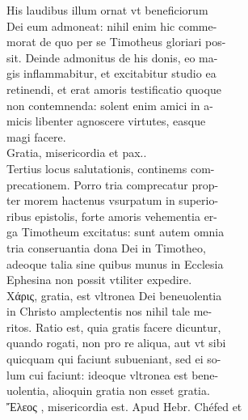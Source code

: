\documentclass{article}
\begin{document}
\begin{pages}
                His laudibus illum ornat vt beneficiorum \\
                Dei eum admoneat: nihil enim hic comme- \\
                morat de quo per se Timotheus gloriari pos- \\
                sit. Deinde admonitus de his donis, eo ma- \\
                gis inflammabitur, et excitabitur studio ea \\
                retinendi, et erat amoris testificatio quoque \\
                non contemnenda: solent enim amici in a- \\
                micis libenter agnoscere virtutes, easque \\
                magi facere. \\
                Gratia, misericordia et pax.. \\
                Tertius locus salutationis, continems com- \\
                precationem. Porro tria comprecatur prop- \\
                ter morem hactenus vsurpatum in superio- \\
                ribus epistolis, forte amoris vehementia er- \\
                ga Timotheum excitatus: sunt autem omnia \\
                tria conseruantia dona Dei in Timotheo, \\
                adeoque talia sine quibus munus in Ecclesia \\
                Ephesina non possit vtiliter expedire. \\
                Xάρις, gratia, est vltronea Dei beneuolentia \\
                in Christo amplectentis nos nihil tale me- \\
                ritos. Ratio est, quia gratis facere dicuntur, \\
                quando rogati, non pro re aliqua, aut vt sibi \\
                quicquam qui faciunt subueniant, sed ei so- \\
                lum cui faciunt: ideoque vltronea est bene- \\
                uolentia, alioquin gratia non esset gratia. \\
                Ἔλεος , misericordia est. Apud Hebr. Chéfed et \\

\end{pages}
\end{document}
